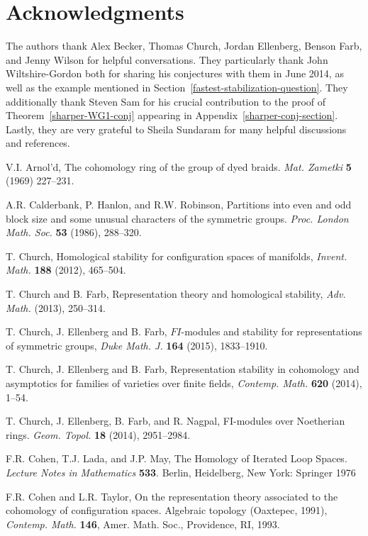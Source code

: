 \documentclass[12pt]{amsart}
\theoremstyle{plain}
\theoremstyle{definition}
\begin{document}
\section*{Acknowledgments}
The authors thank 
Alex Becker,
Thomas Church, 
Jordan Ellenberg, 
Benson Farb,
and Jenny Wilson 
for helpful conversations.
They particularly thank 
John Wiltshire-Gordon both for sharing his 
conjectures 
with them in June 2014, as well as the example mentioned
in Section~\ref{fastest-stabilization-question}.
They additionally thank Steven Sam for his crucial
contribution to the proof of Theorem~\ref{sharper-WG1-conj}
appearing in Appendix~\ref{sharper-conj-section}.  Lastly, 
they are very grateful to Sheila Sundaram for many 
helpful discussions and references.
\begin{thebibliography}{99}

V.I. Arnol'd,
The cohomology ring of the group of dyed braids.
{\it Mat. Zametki} {\bf 5} (1969) 227--231. 

A.R. Calderbank, P. Hanlon, and R.W. Robinson,
Partitions into even and odd block size and some unusual characters 
of the symmetric groups.
{\it Proc. London Math. Soc.} {\bf 53} (1986), 288--320. 

 T. Church, Homological stability for configuration spaces of manifolds, {\it Invent. Math.} {\bf 188} (2012), 465--504.

 T. Church and B. Farb, Representation theory and homological stability, {\it Adv. Math.} (2013), 250--314.

 T. Church, J. Ellenberg and B. Farb, $FI$-modules and stability for representations of symmetric groups, {\it Duke Math. J.} {\bf 164} (2015), 1833--1910. 

 T. Church, J. Ellenberg and B. Farb, Representation stability in cohomology and asymptotics for families of varieties over finite fields, 
{\it Contemp. Math.} {\bf 620} (2014), 1--54.

T. Church, J. Ellenberg, B. Farb, and R. Nagpal, 
FI-modules over Noetherian rings. 
{\it Geom. Topol.} {\bf 18} (2014), 2951--2984. 

F.R. Cohen, T.J. Lada, and J.P. May, 
The Homology of Iterated Loop Spaces. 
{\it Lecture Notes in Mathematics} {\bf 533}. 
Berlin, Heidelberg, New York: Springer 1976

F.R. Cohen and L.R. Taylor, 
On the representation theory associated to the cohomology of 
configuration spaces. Algebraic topology (Oaxtepec, 1991), 
{\it Contemp. Math.} {\bf 146}, Amer. Math. Soc., Providence, RI, 1993. 


\end{thebibliography}
\end{document}
